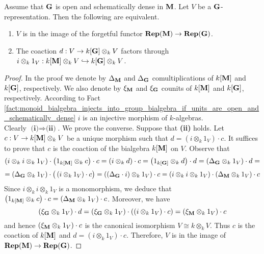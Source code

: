 \begin{theorem}\label{theorem:characterization_of_monoid_representations}
Assume that $\mathbf{G}$ is open and schematically dense in $\mathbf{M}$. Let $V$ be a $\mathbf{G}$-representation. Then the following are equivalent.
\begin{enumerate}[label=\emph{\textbf{(\roman*)}}, leftmargin=3.0em]
\item $V$ is in the image of the forgetful functor $\mathbf{Rep}(\mathbf{M}) \rightarrow \mathbf{Rep}(\mathbf{G})$.
\item The coaction $d:V \rightarrow k[\mathbf{G}]\otimes_kV$ factors through $i\otimes_k1_V:k[\mathbf{M}]\otimes_kV\hookrightarrow k[\mathbf{G}]\otimes_kV$.
\end{enumerate}
\end{theorem}
\begin{proof}
In the proof we denote by $\Delta_{\mathbf{M}}$ and $\Delta_{\mathbf{G}}$ comultiplications of $k[\mathbf{M}]$ and $k[\mathbf{G}]$, respectively. We also denote by $\xi_{\mathbf{M}}$ and $\xi_{\mathbf{G}}$ counits of $k[\mathbf{M}]$ and $k[\mathbf{G}]$, respectively. According to Fact \ref{fact:monoid_bialgebra_injects_into_group_bialgebra_if_units_are_open_and_schematically_dense} $i$ is an injective morphism of $k$-algebras.\\
Clearly $\textbf{(i)}\Rightarrow \textbf{(ii)}$. We prove the converse. Suppose that \textbf{(ii)} holds. Let $c:V\rightarrow k[\mathbf{M}]\otimes_kV$ be a unique morphism such that $d = (i\otimes_k1_V) \cdot c$. It suffices to prove that $c$ is the coaction of the bialgebra $k[\mathbf{M}]$ on $V$. Observe that
$$\left(i\otimes_k i \otimes_k 1_V\right)\cdot \left(1_{k[\mathbf{M}]} \otimes_k c\right)\cdot c = \left(i\otimes_k d \right)\cdot c = \left(1_{k[\mathbf{G}]}\otimes_k d\right)\cdot d = \left(\Delta_{\mathbf{G}}\otimes_k1_V\right) \cdot d =$$
$$=\left(\Delta_{\mathbf{G}}\otimes_k1_V\right) \cdot \big(\left(i\otimes_k 1_V\right) \cdot c\big) = \left((\Delta_{\mathbf{G}}\cdot i )\otimes_k1_V\right) \cdot c = \left(i \otimes_k i \otimes_k 1_V\right) \cdot \left(\Delta_{\mathbf{M}}\otimes_k 1_V\right)\cdot c$$
Since $i\otimes_k i \otimes_k 1_V$ is a monomorphism, we deduce that $\left(1_{k[\mathbf{M}]} \otimes_k c\right)\cdot c =  \left(\Delta_{\mathbf{M}}\otimes_k 1_V\right)\cdot c$. Moreover, we have
$$(\xi_{\mathbf{G}}\otimes_k 1_V)\cdot d = (\xi_{\mathbf{G}}\otimes_k 1_V)\cdot \left((i \otimes_k 1_V) \cdot c\right) = (\xi_{\mathbf{M}}\otimes_k1_V)\cdot c$$
and hence $(\xi_{\mathbf{M}}\otimes_k1_V)\cdot c$ is the canonical isomorphism $V\cong k\otimes_kV$. Thus $c$ is the coaction of $k[\mathbf{M}]$ and $d = (i\otimes_k1_V) \cdot c$. Therefore, $V$ is in the image of $\mathbf{Rep}(\mathbf{M})\rightarrow \mathbf{Rep}(\mathbf{G})$.
\end{proof}

